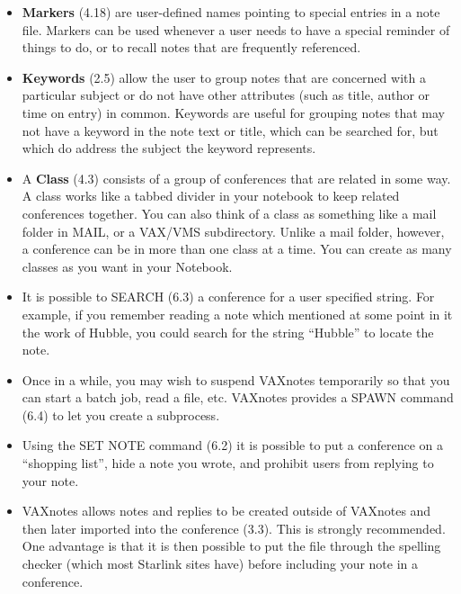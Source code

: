 \begin{itemize}

\item {\bf Markers} (4.18) are user-defined names pointing to special 
entries in a note file. Markers can be used whenever a user needs to have a 
special reminder of things to do, or to recall notes that are frequently 
referenced.

\item {\bf Keywords} (2.5) allow the user to group notes that are concerned
with a particular subject or do not have other attributes (such as title,
author or time on entry) in common. Keywords are useful for grouping notes 
that may not have a keyword in the note text or title, which can be searched
for, but which do address the subject the keyword represents.

\item A {\bf Class} (4.3) consists of a group of conferences that are related
in some way. A class works like a tabbed divider in your notebook to keep
related conferences together. You can also think of a class as something like a
mail folder in MAIL, or a VAX/VMS subdirectory.  Unlike a mail folder, however,
a conference can be in more than one class at a time.  You can create as many
classes as you want in your Notebook. 

\item It is possible to SEARCH (6.3) a conference for a user specified
string. For example, if you remember reading a note which mentioned
at some point in it the work of Hubble, you could search for the 
string ``Hubble'' to locate the note.

\item Once in a while, you may wish to suspend VAXnotes temporarily
so that you can start a batch job, read a file, etc. VAXnotes
provides a SPAWN command (6.4) to let you create a subprocess.

\item Using the SET NOTE command (6.2) it is possible to put a conference
on a ``shopping list'', hide a note you wrote, and prohibit users from 
replying to your note.

\item VAXnotes allows notes and replies to be created outside of VAXnotes
and then later imported into the conference (3.3). This is strongly recommended.
One advantage is that it is then possible to put the file through the spelling checker
(which most Starlink sites have) before including your note in a conference.


\end{itemize}
